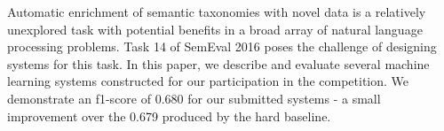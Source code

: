 Automatic enrichment of semantic taxonomies with novel data is a relatively unexplored task with potential benefits in a broad array of natural language processing problems. Task 14 of SemEval 2016 poses the challenge of designing systems for this task. In this paper, we describe and evaluate several machine learning systems constructed for our participation in the competition. We demonstrate an f1-score of 0.680 for our submitted systems - a small improvement over the 0.679 produced by the hard baseline.

